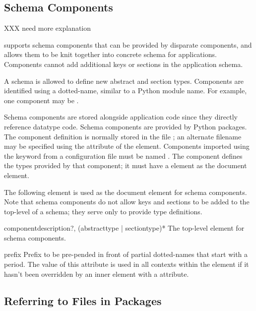\documentclass{howto}
\newcommand{\datatype}[1]{\strong{#1}}
\begin{document}
\subsection{Schema Components \label{schema-components}}

XXX need more explanation

 supports schema components that can be
provided by disparate components, and allows them to be knit together
into concrete schema for applications.  Components cannot add
additional keys or sections in the application schema.

A schema  is allowed to define new abstract and
section types.
Components are identified using a dotted-name, similar to a Python
module name.  For example, one component may be .

Schema components are stored alongside application code since they
directly reference datatype code.  Schema components are provided by
Python packages.  The component definition is normally stored in the
file ; an alternate filename may be specified
using the  attribute of the  element.
Components imported using the  keyword from a
configuration file must be named .
The component defines the types provided by that component; it must
have a  element as the document element.

The following element is used as the document element for schema
components.  Note that schema components do not allow keys and
sections to be added to the top-level of a schema; they serve only to
provide type definitions.

\begin{elementdesc}{component}{description?, (abstracttype | sectiontype)*}
  The top-level element for schema components.

  \begin{attributedesc}{prefix}{\datatype{dotted-name}}
    Prefix to be pre-pended in front of partial dotted-names that
    start with a period.  The value of this attribute is used in all
    contexts within the  element if it hasn't been
    overridden by an inner element with a 
    attribute.
  \end{attributedesc}
\end{elementdesc}


\subsection{Referring to Files in Packages}
\end{document}
